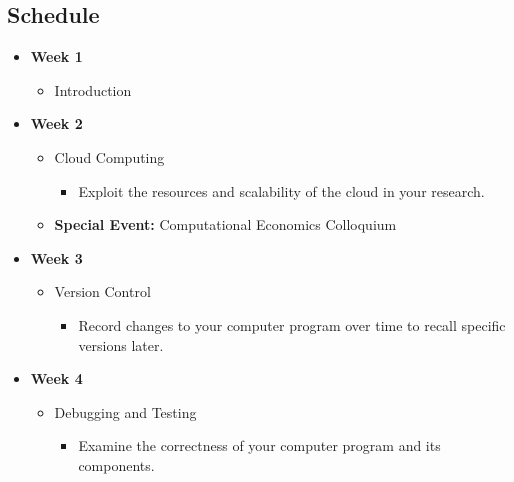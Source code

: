 \subsection*{Schedule} 
\begin{itemize}
\item \textbf{Week 1}
	\begin{itemize}
	\item Introduction
	\end{itemize}
\item \textbf{Week 2}
	\begin{itemize}
	\item Cloud Computing
		\begin{itemize}
		\item Exploit the resources and scalability of the cloud in your research.
		\end{itemize}	
	\item \textbf{Special Event:} Computational Economics Colloquium 
	\end{itemize}
\item \textbf{Week 3}
	\begin{itemize}
	\item Version Control
		\begin{itemize}
		\item Record changes to your computer program over time to recall specific versions later.
		\end{itemize}
	\end{itemize}
\item \textbf{Week 4}
	\begin{itemize}
	\item Debugging and Testing
		\begin{itemize}
		\item Examine the correctness of your computer program and its components.

\end{itemize}
\end{itemize}
\end{itemize}
